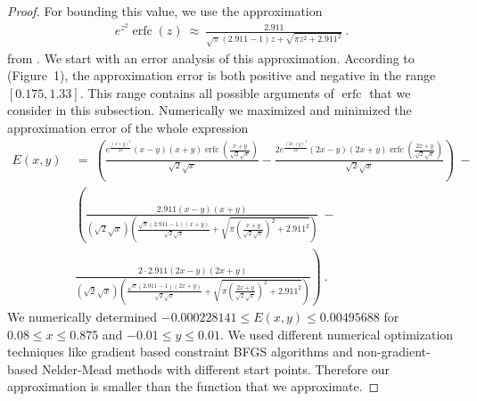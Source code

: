 \documentclass{article}
\renewcommand{\leq}{\leqslant}
\DeclareMathOperator{\erfc}{erfc}
\begin{document}
\begin{proof}
For bounding this value, we use the approximation 
\begin{align}
e^{z^2} \erfc (z) \ \approx \ \frac{2.911}{\sqrt{\pi } (2.911 -1)
  z+\sqrt{\pi  z^2+2.911^2}} \ .
\end{align}
from \citet{Ren:07}.
We start with an error analysis of this approximation.
According to \citet{Ren:07} (Figure~1), the approximation 
error is both positive and negative in the range
$[0.175,1.33]$.  This range contains all possible
arguments of $\erfc $ that we consider in this subsection.
Numerically we maximized and minimized the approximation error of the
whole expression
\begin{align}
E(x,y) \ &= \ \left(\frac{e^{\frac{(x+y)^2}{2 x}} (x-y) (x+y)
  \erfc \left(\frac{x+y}{\sqrt{2} \sqrt{x}}\right)}{\sqrt{2}
  \sqrt{x}}-\frac{2 e^{\frac{(2 x+y)^2}{2 x}} (2 x-y) (2 x+y)
  \erfc \left(\frac{2 x+y}{\sqrt{2} \sqrt{x}}\right)}{\sqrt{2}
  \sqrt{x}}\right) \ - \\ \nonumber 
&\left(\frac{2.911 (x-y) (x+y)}{\left(\sqrt{2} \sqrt{x}\right) \left(\frac{\sqrt{\pi } (2.911 -1) (x+y)}{\sqrt{2} \sqrt{x}}+\sqrt{\pi  \left(\frac{x+y}{\sqrt{2} \sqrt{x}}\right)^2+2.911^2}\right)}\ - \right. \\ \nonumber 
&\left. \frac{2 \cdot 2.911 (2 x-y) (2 x+y)}{\left(\sqrt{2} \sqrt{x}\right) \left(\frac{\sqrt{\pi } (2.911 -1) (2 x+y)}{\sqrt{2} \sqrt{x}}+\sqrt{\pi  \left(\frac{2 x+y}{\sqrt{2} \sqrt{x}}\right)^2+2.911^2}\right)}\right) \ .
\end{align}
We numerically determined $-0.000228141 \leq E(x,y) \leq 0.00495688$ for 
$0.08 \leq x \leq 0.875$ and $-0.01 \leq y \leq 0.01$. 
We used different numerical optimization techniques like  
gradient based constraint BFGS algorithms and 
non-gradient-based Nelder-Mead methods with different start points.
Therefore our approximation is smaller than the function that we
approximate. 


\end{proof}
\end{document}
